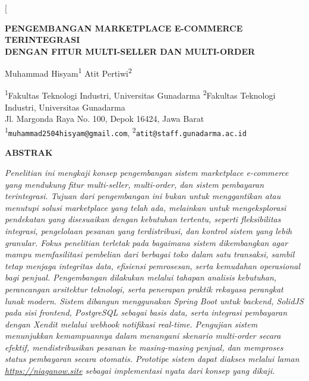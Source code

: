 \documentclass[12pt,a4paper,twocolumn]{article}
\begin{document}
\twocolumn[
\begin{@twocolumnfalse}
\begin{center}

{\bfseries PENGEMBANGAN MARKETPLACE E-COMMERCE TERINTEGRASI \\
DENGAN FITUR MULTI-SELLER DAN MULTI-ORDER}

\vspace{12pt}

{\normalsize
Muhammad Hisyam\textsuperscript{1} Atit Pertiwi\textsuperscript{2}
}

\vspace{8pt}

{\small
\textsuperscript{1}Fakultas Teknologi Industri, Universitas Gunadarma \textsuperscript{2}Fakultas Teknologi Industri, Universitas Gunadarma \\
Jl. Margonda Raya No. 100, Depok 16424, Jawa Barat \\[4pt]
\textsuperscript{1}\texttt{muhammad2504hisyam@gmail.com}, \textsuperscript{2}\texttt{atit@staff.gunadarma.ac.id}
}

\vspace{16pt}

\begin{minipage}{0.85\textwidth}
\begin{center}
    {\normalsize\bfseries ABSTRAK}
\end{center}
\vspace{-14pt}
{\footnotesize\itshape\singlespacing
Penelitian ini mengkaji konsep pengembangan sistem marketplace e-commerce yang mendukung fitur multi-seller, multi-order, dan sistem pembayaran terintegrasi. Tujuan dari pengembangan ini bukan untuk menggantikan atau menutupi solusi marketplace yang telah ada, melainkan untuk mengeksplorasi pendekatan yang disesuaikan dengan kebutuhan tertentu, seperti fleksibilitas integrasi, pengelolaan pesanan yang terdistribusi, dan kontrol sistem yang lebih granular. Fokus penelitian terletak pada bagaimana sistem dikembangkan agar mampu memfasilitasi pembelian dari berbagai toko dalam satu transaksi, sambil tetap menjaga integritas data, efisiensi pemrosesan, serta kemudahan operasional bagi penjual. Pengembangan dilakukan melalui tahapan analisis kebutuhan, perancangan arsitektur teknologi, serta penerapan praktik rekayasa perangkat lunak modern. Sistem dibangun menggunakan Spring Boot untuk backend, SolidJS pada sisi frontend, PostgreSQL sebagai basis data, serta integrasi pembayaran dengan Xendit melalui webhook notifikasi real-time. Pengujian sistem menunjukkan kemampuannya dalam menangani skenario multi-order secara efektif, mendistribusikan pesanan ke masing-masing penjual, dan memproses status pembayaran secara otomatis. Prototipe sistem dapat diakses melalui laman \url{https://niaganow.site} sebagai implementasi nyata dari konsep yang dikaji.
\par}


\end{minipage}
\end{center}
\end{@twocolumnfalse}
\end{document}
